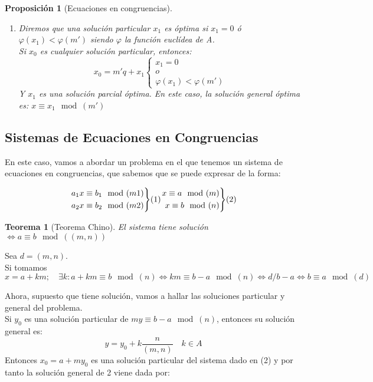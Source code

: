 \documentclass[11pt, a4paper, titlepage]{article}
\makeatletter
\renewenvironment{proof}[1][\proofname] {\vspace{-15pt}\par\pushQED{\qed}\normalfont\topsep6\p@\@plus6\p@\relax\trivlist\item[\hskip\labelsep\it#1\@addpunct{.}]\ignorespaces}{\popQED\endtrivlist\@endpefalse}
\theoremstyle{theorem-style}
\newtheorem*{nth}{Teorema}
\newtheorem*{nprop}{Proposición}
\theoremstyle{definition-style}
\theoremstyle{remark-style}
\theoremstyle{example-style}
\newenvironment{rcases}
  {\left.\begin{aligned}}
  {\end{aligned}\right\rbrace}
\makeatother
\begin{document}
\begin{nprop}[Ecuaciones en congruencias]
\begin{itemize}
\begin{enumerate}
\item Diremos que una solución particular $x_1$ es óptima si $x_1 = 0$ ó $\varphi(x_1) < \varphi(m')$ siendo $\varphi$ la función euclídea de A.\\
Si $x_0$ es cualquier solución particular, entonces:
\[
x_0 = m'q + x_1 \begin{cases}
	x_1 = 0\\
	o\\
	\varphi(x_1) < \varphi(m')
	
\end{cases}
\]
Y $x_1$ es una solución parcial óptima. En este caso, la solución general óptima es: $x\equiv x_1 \mod(m')$
\end{enumerate}
\end{itemize}
	
\end{nprop}

\subsection{Sistemas de Ecuaciones en Congruencias}

En este caso, vamos a abordar un problema en el que tenemos un sistema de ecuaciones en congruencias, que sabemos que se puede expresar de la forma:

\[
\begin{rcases}
	a_1x \equiv b_1 \mod(m1)\\
	a_2x \equiv b_2 \mod(m2)
\end{rcases}(1) \begin{rcases}
	x \equiv a \mod(m)\\
	x \equiv b \mod(n)
\end{rcases}(2)
\]

\begin{nth}[Teorema Chino]
	El sistema tiene solución $\iff a \equiv b \mod((m,n))$
\end{nth}
\begin{proof}
	Sea $d=(m,n)$. \\
	Si tomamos $x = a+km; \quad \exists k: a+km \equiv b \mod(n) \iff km \equiv b-a \mod(n) \iff d/b-a \iff b\equiv a\mod(d)$
\end{proof}

Ahora, supuesto que tiene solución, vamos a hallar las soluciones particular y general del problema.\\
Si $y_0$ es una solución particular de $my \equiv b-a \mod(n)$, entonces su solución general es: $$y = y_0 + k\frac{n}{(m,n)} \quad k \in A$$
Entonces $x_0 = a + my_0$ es una solución particular del sistema dado en (2) y por tanto la solución general de 2 viene dada por:
\end{document}
